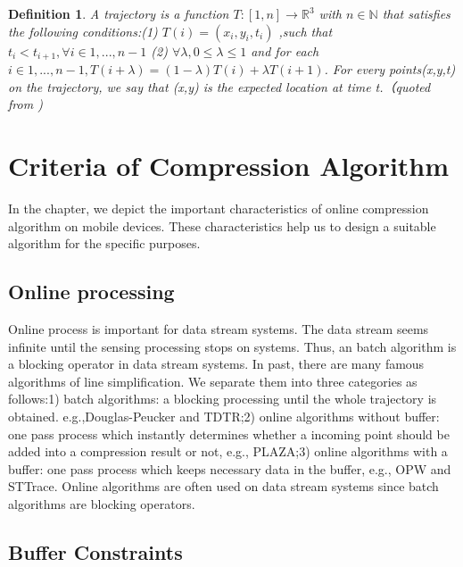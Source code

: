 \documentclass[12pt]{article}
\newtheorem{mydef}{Definition}
\begin{document}
\begin{CJK}{UTF8}{bsmi}
\begin{mydef}
A trajectory is a function $T:[1,n]\rightarrow \mathbb{R}^3$ with $n \in \mathbb{N} $ that satisfies the following conditions:(1) $T(i)=(x_i,y_i,t_i)$
,such that  $t_i < t_{i+1},\forall i\in {1,...,n-1}$ (2) $\forall \lambda, 0\leq\lambda\leq1$ and for each $i\in{1,...,n-1},T(i+\lambda) = (1-\lambda)T(i)+\lambda T(i+1)$. For every points(x,y,t) on the trajectory, we say that (x,y) is the expected location at time t.（quoted from \mbox{\cite{2006:Cao}})
\end{mydef}


\section{Criteria of Compression Algorithm}

In the chapter, we depict the important characteristics of online compression  algorithm on mobile devices. These characteristics help us to design a suitable algorithm for the specific purposes.\\

\subsection{Online processing}

Online process is important for data stream systems. The data stream seems infinite until the sensing processing stops on systems. Thus, an batch algorithm is a blocking operator in data stream systems. In past, there are many famous algorithms of line simplification. We separate them into three categories as follows:1) batch algorithms: a blocking processing until the whole trajectory is obtained. e.g.,Douglas-Peucker\cite{1973:DP} and TDTR\cite{2004:TDTROPW};2) online algorithms without buffer: one pass process which instantly determines whether a incoming point should be added into a compression result or not, e.g., PLAZA\cite{streamdataGIS};3) online algorithms with a buffer: one pass process which keeps necessary data in the buffer, e.g., OPW\cite{2004:TDTROPW} and STTrace\cite{2006:STTrace}. Online algorithms are often used on data stream systems since batch algorithms are blocking operators.


\subsection{Buffer Constraints}



\end{CJK}
\end{document}
